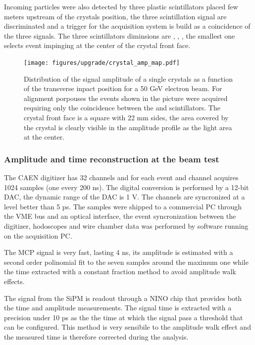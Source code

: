 Incoming particles were also detected by three plastic scintillators placed few meters upstream of the crystals position, the
three scintillation signal are discriminated and a trigger for the acquisition system is build as a coincidence of the three signals.
The three scintillators diminsions are \sixbysix, \threebythree, \onebyone, the smallest one selects event impinging at the
center of the \twobytwo crystal front face.

\begin{figure}[h!]
  \centering
  \texttt{[image: figures/upgrade/crystal\_amp\_map.pdf]}
  \caption{Distribution of the signal amplitude of a single crystals as a function of the transverse inpact position for
    a 50 GeV electron beam. For alignment porpouses the events shown in the picture
    were acquired requiring only the coincidence between the \sixbysix and \threebythree scintillators.
    The crystal front face is a square with 22 mm sides, the area covered by the crystal is clearly visible in the amplitude
    profile as the light area at the center.}
  \label{fig:crystal_amp_map}
\end{figure}

\subsubsection{Amplitude and time reconstruction at the beam test}
The CAEN digitizer has 32 channels and for each event and channel acquires 1024 samples (one every 200 ns). The
digital conversion is performed by a 12-bit DAC, the dynamic range of the DAC is 1 V.
The channels are syncronized at a level better than 5 ps.
The samples were shipped to a commercial PC through the VME bus and an optical interface, the event
syncronization between the digitizer, hodoscopes and wire chamber data was performed by software running on the
acquisition PC.

The MCP signal is very fast, lasting 4 ns, its amplitude is estimated with a second order polinomial fit to the seven samples
around the maximum one while the time extracted with a constant fraction method to avoid amplitude walk effects.

The signal from the SiPM is readout through a NINO chip that provides both the time and amplitude measurements.
The signal time is extracted with a precision under 10 ps as the the time at which the signal pass a threshold that
can be configured. This method is very sensibile to the amplitude walk effect and the measured time is therefore
corrected during the analysis.

